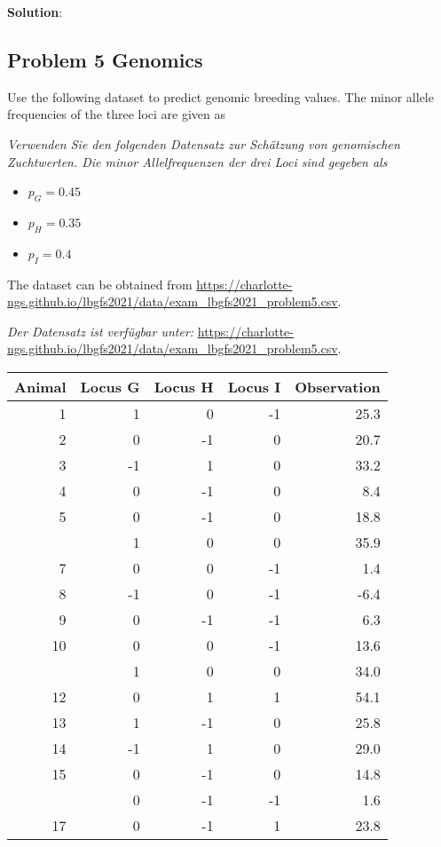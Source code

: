 \documentclass[
]{article}
\providecommand{\tightlist}{%
  \setlength{\itemsep}{0pt}\setlength{\parskip}{0pt}}
\newcommand{\solstart}
{\vspace{3ex}\textbf{Solution}:}
\begin{document}
\solstart

\clearpage
\pagebreak

\hypertarget{problem-5-genomics}{%
\subsection{Problem 5 Genomics}\label{problem-5-genomics}}

Use the following dataset to predict genomic breeding values. The minor
allele frequencies of the three loci are given as

\textit{Verwenden Sie den folgenden Datensatz zur Schätzung von genomischen Zuchtwerten. Die minor Allelfrequenzen der drei Loci sind gegeben als}

\begin{itemize}
\tightlist
\item
  \(p_G = 0.45\)
\item
  \(p_H = 0.35\)
\item
  \(p_I = 0.4\)
\end{itemize}

The dataset can be obtained from
\url{https://charlotte-ngs.github.io/lbgfs2021/data/exam_lbgfs2021_problem5.csv}.

\textit{Der Datensatz ist verfügbar unter: }
\url{https://charlotte-ngs.github.io/lbgfs2021/data/exam_lbgfs2021_problem5.csv}.

\vspace{3ex}

\begin{tabular}{rrrrr}
\toprule
Animal & Locus G & Locus H & Locus I & Observation\\
\midrule
1 & 1 & 0 & -1 & 25.3\\
2 & 0 & -1 & 0 & 20.7\\
3 & -1 & 1 & 0 & 33.2\\
4 & 0 & -1 & 0 & 8.4\\
5 & 0 & -1 & 0 & 18.8\\
\addlinespace
6 & 1 & 0 & 0 & 35.9\\
7 & 0 & 0 & -1 & 1.4\\
8 & -1 & 0 & -1 & -6.4\\
9 & 0 & -1 & -1 & 6.3\\
10 & 0 & 0 & -1 & 13.6\\
\addlinespace
11 & 1 & 0 & 0 & 34.0\\
12 & 0 & 1 & 1 & 54.1\\
13 & 1 & -1 & 0 & 25.8\\
14 & -1 & 1 & 0 & 29.0\\
15 & 0 & -1 & 0 & 14.8\\
\addlinespace
16 & 0 & -1 & -1 & 1.6\\
17 & 0 & -1 & 1 & 23.8\\
\bottomrule
\end{tabular}
\end{document}
